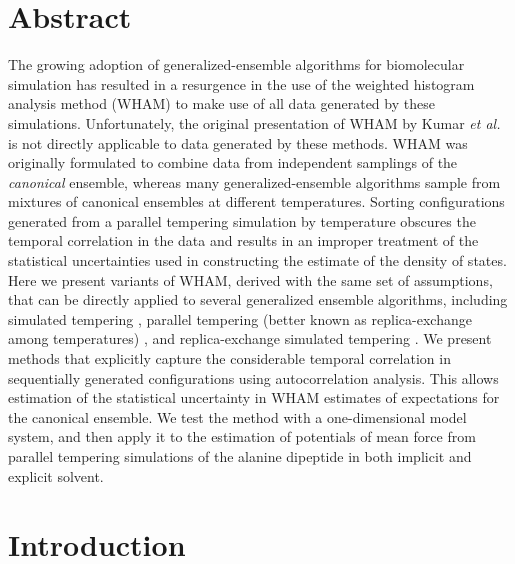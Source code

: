
\section*{Abstract}

The growing adoption of generalized-ensemble algorithms \cite{okamoto:2004a} for biomolecular simulation has resulted in a resurgence in the use of the weighted histogram analysis method (WHAM) \cite{kumar:1992a} to make use of all data generated by these simulations.  Unfortunately, the original presentation of WHAM by Kumar \emph{et al.} \cite{kumar:1992a} is not directly applicable to data generated by these methods.  WHAM was originally formulated to combine data from independent samplings of the \emph{canonical} ensemble, whereas many generalized-ensemble algorithms sample from mixtures of canonical ensembles at different temperatures.  Sorting configurations generated from a parallel tempering simulation by temperature obscures the temporal correlation in the data and results in an improper treatment of the statistical uncertainties used in constructing the estimate of the density of states.  Here we present variants of WHAM, derived with the same set of assumptions, that can be directly applied to several generalized ensemble algorithms, including simulated tempering \cite{mitsutake:2000a}, parallel tempering (better known as replica-exchange among temperatures) \cite{sugita:1999a}, and replica-exchange simulated tempering \cite{mitsutake:2000a}.  We present methods that explicitly capture the considerable temporal correlation in sequentially generated configurations using autocorrelation analysis.  This allows estimation of the statistical uncertainty in WHAM estimates of expectations for the canonical ensemble.  We test the method with a one-dimensional model system, and then apply it to the estimation of potentials of mean force from parallel tempering simulations of the alanine dipeptide in both implicit and explicit solvent.

\section{Introduction}

